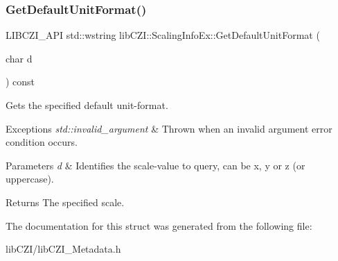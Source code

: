 \subsubsection{\texorpdfstring{Get\+Default\+Unit\+Format()}{GetDefaultUnitFormat()}}
{\footnotesize\ttfamily L\+I\+B\+C\+Z\+I\+\_\+\+A\+PI std\+::wstring lib\+C\+Z\+I\+::\+Scaling\+Info\+Ex\+::\+Get\+Default\+Unit\+Format (\begin{DoxyParamCaption}\item[{char}]{d }\end{DoxyParamCaption}) const\hspace{0.3cm}{\ttfamily [inline]}}

Gets the specified default unit-\/format.


\begin{DoxyExceptions}{Exceptions}
{\em std\+::invalid\+\_\+argument} & Thrown when an invalid argument error condition occurs.\\
\hline
\end{DoxyExceptions}

\begin{DoxyParams}{Parameters}
{\em d} & Identifies the scale-\/value to query, can be \textquotesingle{}x\textquotesingle{}, \textquotesingle{}y\textquotesingle{} or \textquotesingle{}z\textquotesingle{} (or uppercase).\\
\hline
\end{DoxyParams}
\begin{DoxyReturn}{Returns}
The specified scale. 
\end{DoxyReturn}


The documentation for this struct was generated from the following file\+:\begin{DoxyCompactItemize}
\item 
lib\+C\+Z\+I/lib\+C\+Z\+I\+\_\+\+Metadata.\+h\end{DoxyCompactItemize}
